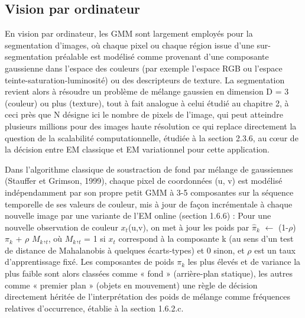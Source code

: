 \subsection{Vision par ordinateur}
En vision par ordinateur, les GMM sont largement employés pour la segmentation d'images, où chaque pixel  ou chaque région issue d'une sur-segmentation préalable  est modélisé comme provenant d'une composante gaussienne dans l'espace des couleurs (par exemple l'espace RGB ou l'espace teinte-saturation-luminosité) ou des descripteurs de texture. La segmentation revient alors à résoudre un problème de mélange gaussien en dimension D = 3 (couleur) ou plus (texture), tout à fait analogue à celui étudié au chapitre 2, à ceci près que N désigne ici le nombre de pixels de l'image, qui peut atteindre plusieurs millions pour des images haute résolution  ce qui replace directement la question de la scalabilité computationnelle, étudiée à la section 2.3.6, au cœur de la décision entre EM classique et EM variationnel pour cette application.

Dans l'algorithme classique de soustraction de fond par mélange de gaussiennes (Stauffer et Grimson, 1999), chaque pixel de coordonnées (u, v) est modélisé indépendamment par son propre petit GMM à 3-5 composantes sur la séquence temporelle de ses valeurs de couleur, mis à jour de façon incrémentale à chaque nouvelle image par une variante de l'EM online (section 1.6.6) : Pour une nouvelle observation de couleur $x_{t}$(u,v), on met à jour les poids par $\hat{\pi }$$_{k}$ $\leftarrow $ (1-$\rho $) $\pi _{k}$ + $\rho $ $M_{k}$,$_{t}$, où $M_{k}$,$_{t}$ = 1 si $x_{t}$ correspond à la composante k (au sens d'un test de distance de Mahalanobis à quelques écarts-types) et 0 sinon, et $\rho $ est un taux d'apprentissage fixé. Les composantes de poids $\pi _{k}$ les plus élevés et de variance la plus faible sont alors classées comme « fond » (arrière-plan statique), les autres comme « premier plan » (objets en mouvement)  une règle de décision directement héritée de l'interprétation des poids de mélange comme fréquences relatives d'occurrence, établie à la section 1.6.2.c.

